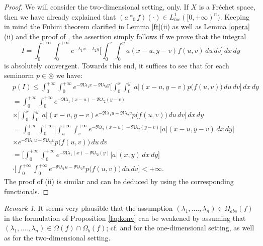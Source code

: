 \documentclass{amsart}
\theoremstyle{definition}
\theoremstyle{remark}
\newtheorem{rem}[thm]{Remark}
\numberwithin{equation}{section}
\begin{document}
\begin{proof}
We will consider the two-dimensional setting, only. If $X$ is a Fr\' echet space, then we have already explained that $(a\ast_{0}f)(\cdot)\in L_{loc}^{1}([0,+\infty)^{n}).$ Keeping in mind the Fubini theorem clarified in Lemma \ref{ft}(ii) as well as Lemma \ref{opera}(ii) and the proof of \cite[Theorem 4.1]{debnath}, the assertion simply follows if we prove that the integral
$$
I=\int_{0}^{+\infty}\int^{+\infty}_{0}e^{-\lambda_{1}x-\lambda_{2}y}\Biggl[ \int^{x}_{0}\int^{y}_{0}a(x-u,y-v)f(u,v)\, du\, dv\Biggr] \, dx\, dy
$$
is absolutely convergent. Towards this end, it suffices to see that for each seminorm $p\in \circledast$ we have:
\begin{align*}
& p(I)\leq \int_{0}^{+\infty}\int^{+\infty}_{0}e^{-\Re \lambda_{1}x-\Re \lambda_{2}y}\Biggl[ \int^{x}_{0}\int^{y}_{0}|a|(x-u,y-v)p\bigl(f(u,v)\bigr)\, du\, dv\Biggr] \, dx\, dy
\\& =\int_{0}^{+\infty}\int^{+\infty}_{0}e^{-\Re \lambda_{1}(x-u)-\Re \lambda_{2}(y-v)}\\& \times \Biggl[ \int^{x}_{0}\int^{y}_{0}|a|(x-u,y-v)e^{-\Re \lambda_{1}u-\Re \lambda_{2}v}p\bigl(f(u,v)\bigr)\, du\, dv\Biggr] \, dx\, dy
\\& =\int_{0}^{+\infty}\int^{+\infty}_{0}\Biggl[ \int^{+\infty}_{u}\int^{+\infty}_{v}e^{-\Re \lambda_{1}(x-u)-\Re \lambda_{2}(y-v)}|a|(x-u,y-v)\, dx\, dy\Biggr] 
\\& \times e^{-\Re \lambda_{1}u-\Re \lambda_{2}v}p\bigl(f(u,v)\bigr)\, du\, dv
\\& =\Biggl[ \int^{+\infty}_{0}\int^{+\infty}_{0}e^{-\Re \lambda_{1}(x)-\Re \lambda_{2}(y)}|a|(x,y)\, dx\, dy\Biggr] 
\\& \cdot  \Biggl[ \int_{0}^{+\infty}\int^{+\infty}_{0}e^{-\Re \lambda_{1}u-\Re \lambda_{2}v}p\bigl(f(u,v)\bigr)\, du\, dv\Biggr] <+\infty.
\end{align*}
The proof of (ii) is similar and can be deduced by using the corresponding functionals.
\end{proof}

\begin{rem}\label{poginuosam}
It seems very plausible that the assumption $(\lambda_{1},....,\lambda_{n})\in \Omega_{abs}(f)$ in the formulation of Proposition \ref{lapkonv} can be weakened by assuming that $(\lambda_{1},....,\lambda_{n})\in \Omega(f) \cap \Omega_{b}(f)$; cf. \cite[Proposition 1.6.4]{a43} and \cite[Theorem 1.4.2(vi)]{FKP} for the one-dimensional setting, as well as \cite[Theorem 5.2]{bern1} for the two-dimensional setting.
\end{rem}
\end{document}
